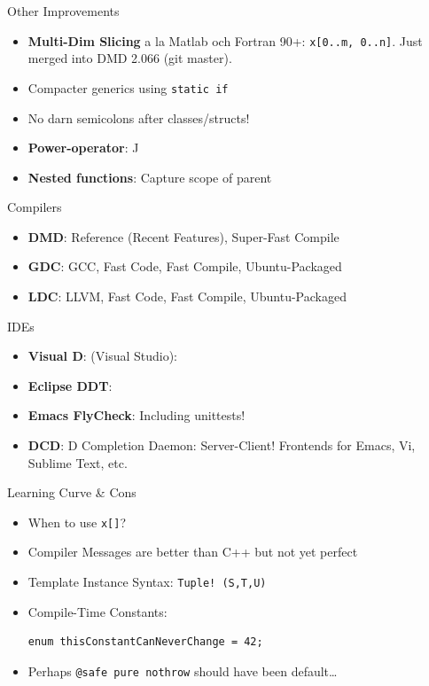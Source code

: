 \documentclass[xcolor=dvipsnames]{beamer}
\begin{document}
\begin{frame}[fragile]{Other Improvements}
  \begin{itemize}[<+->]
  \item \textbf{Multi-Dim Slicing} a la Matlab och Fortran 90+:
    \texttt{x[0..m, 0..n]}. Just merged into DMD 2.066 (git master).
  \item Compacter generics using \texttt{static if}
  \item No darn semicolons after classes/structs!
  \item \textbf{Power-operator}: ^^
  \item \textbf{Nested functions}: Capture scope of parent
  \end{itemize}
\end{frame}

\begin{frame}[fragile]{Compilers}
  \begin{itemize}[<+->]
  \item \textbf{DMD}: Reference (Recent Features), Super-Fast Compile
  \item \textbf{GDC}: GCC, Fast Code, Fast Compile, Ubuntu-Packaged
  \item \textbf{LDC}: LLVM, Fast Code, Fast Compile, Ubuntu-Packaged
  \end{itemize}
\end{frame}

\begin{frame}[fragile]{IDEs}
  \begin{itemize}[<+->]
  \item \textbf{Visual D}: (Visual Studio):
  \item \textbf{Eclipse DDT}:
  \item \textbf{Emacs FlyCheck}: Including unittests!
  \item \textbf{DCD}: D Completion Daemon: Server-Client! Frontends for Emacs,
    Vi, Sublime Text, etc.
  \end{itemize}
\end{frame}

\begin{frame}[fragile]{Learning Curve \& Cons}
  \begin{itemize}[<+->]
  \item When to use \texttt{x[]}?
  \item Compiler Messages are better than C++ but not yet perfect
  \item Template Instance Syntax: \texttt{Tuple! (S,T,U)}
  \item Compile-Time Constants:
\begin{lstlisting}[frame=single]
  enum thisConstantCanNeverChange = 42;
\end{lstlisting}
  \item Perhaps \texttt{@safe pure nothrow} should have been default\ldots
  \end{itemize}
\end{frame}
\end{document}
